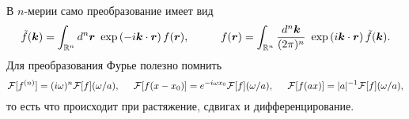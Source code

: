 В $n$-мерии само преобразование имеет вид
\begin{equation*}
	\tilde{f}(\vc{k}) = \int_{\mathbb{R}^n} d^n \vc{r} \ \exp\left(-i \vc{k} \cdot \vc{r}\right) f(\vc{r}),
	\hspace{10 mm} 
	f(\vc{r}) = \int_{\mathbb{R}^n} \frac{d^n \vc{k}}{(2\pi)^n} \ \exp\left(i \vc{k} \cdot \vc{r}\right) \tilde{f}(\vc{k}).
\end{equation*}
Для преобразования Фурье полезно помнить
\begin{equation*}
	\mathcal{F}[f^{(n)}] = (i \omega)^n \mathcal{F}[f](\omega/a),
	\hspace{5 mm} 
	\mathcal{F}[f(x-x_0)] = e^{- i \omega x_0} \mathcal{F}[f](\omega/a),
	\hspace{5 mm} 
	\mathcal{F}[f(ax)] = |a|^{-1} \mathcal{F}[f](\omega/a),
\end{equation*}
то есть что происходит при растяжение, сдвигах и дифференцирование. 

